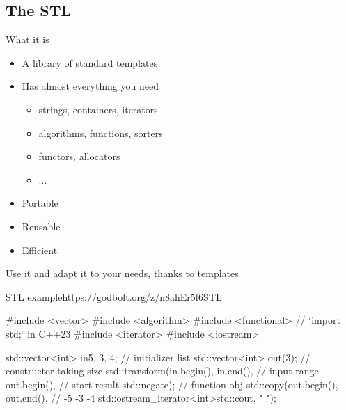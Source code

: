 \subsection[STL]{The STL}

\begin{frame}[fragile]
  \begin{block}{What it is}
    \begin{itemize}
    \item A library of standard templates
    \item Has almost everything you need
      \begin{itemize}
      \item strings, containers, iterators
      \item algorithms, functions, sorters
      \item functors, allocators
      \item ...
      \end{itemize}
    \item Portable
    \item Reusable
    \item Efficient
    \end{itemize}
  \end{block}
  \pause
  \begin{exampleblock}{Use it}
    and adapt it to your needs, thanks to templates
  \end{exampleblock}
\end{frame}

\begin{frame}[fragile]
  \begin{exampleblockGB}{STL example}{https://godbolt.org/z/n8ahEr5f6}{STL}
    \begin{cppcode*}{}
      #include <vector>
      #include <algorithm>
      #include <functional>     // `import std;` in C++23
      #include <iterator>
      #include <iostream>

      std::vector<int> in{5, 3, 4};    // initializer list
      std::vector<int> out(3);  // constructor taking size
      std::transform(in.begin(), in.end(),  // input range
                     out.begin(),          // start result
                     std::negate{});       // function obj
      std::copy(out.begin(), out.end(),    // -5 -3 -4
        std::ostream_iterator<int>{std::cout, " "});
    \end{cppcode*}
  \end{exampleblockGB}
\end{frame}

